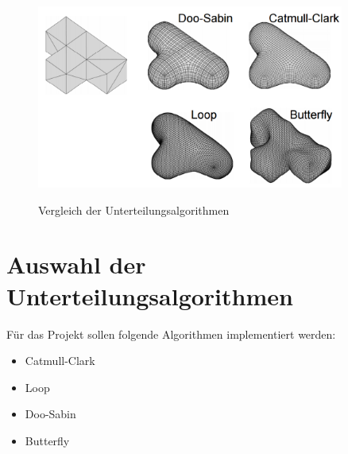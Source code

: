 \begin{figure}
  \caption{Vergleich der Unterteilungsalgorithmen \cite{Standford.24.07.2015}}
  \centering
  \includegraphics[width=0.9\textwidth]{content/media/sd_overview.png}
  \label{fig:sd_comp}
\end{figure}

\section{Auswahl der Unterteilungsalgorithmen}

Für das Projekt sollen folgende Algorithmen implementiert werden:
\begin{itemize}
	\item Catmull-Clark
	\item Loop
	\item Doo-Sabin
	\item Butterfly
\end{itemize}


